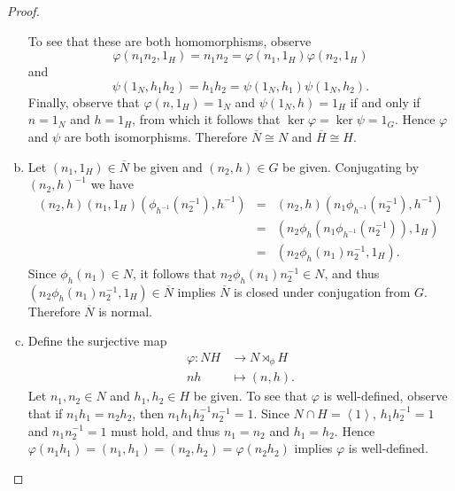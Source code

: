 \documentclass[10pt]{amsart}
\begin{document}
\begin{thm}
\begin{proof}
\begin{enumerate}[(a)]
      To see that these are both homomorphisms, observe
      $$\varphi(n_1n_2, 1_H) = n_1n_2 = \varphi(n_1, 1_H)\varphi(n_2, 1_H)$$
      and
      $$\psi(1_N, h_1h_2) = h_1h_2 = \psi(1_N, h_1)\psi(1_N, h_2).$$
      Finally, observe that $\varphi(n,1_H) = 1_N$ and $\psi(1_N, h) = 1_H$ if and only if $n = 1_N$ and $h = 1_H$, from which it follows that $\ker\varphi = \ker\psi = 1_G$.
      Hence $\varphi$ and $\psi$ are both isomorphisms.
      Therefore $\overline{N} \cong N$ and $\overline{H} \cong H$.
    \item
      Let $(n_1, 1_H) \in \overline{N}$ be given and $(n_2, h) \in G$ be given.
      Conjugating by $(n_2, h)^{-1}$ we have
      \begin{eqnarray*}
      (n_2, h)(n_1, 1_H)(\phi_{h^{-1}}(n_2^{-1}), h^{-1}) &=& (n_2, h)(n_1\phi_{h^{-1}}(n_2^{-1}), h^{-1})\\
	   &=& (n_2\phi_h(n_1\phi_{h^{-1}}(n_2^{-1})), 1_H)\\
       &=& (n_2\phi_h(n_1)n_2^{-1}, 1_H).
      \end{eqnarray*}
      Since $\phi_h(n_1) \in N$, it follows that $n_2\phi_h(n_1)n_2^{-1} \in N$, and thus $(n_2\phi_h(n_1)n_2^{-1}, 1_H) \in \overline{N}$ implies $\overline{N}$ is closed under conjugation from $G$.
      Therefore $\overline{N}$ is normal.
      
    \item
      Define the surjective map
      \begin{align*}
	\varphi \colon NH &\rightarrow N \rtimes_{\phi} H\\
	nh & \mapsto (n, h).
      \end{align*}
      Let $n_1, n_2 \in N$ and $h_1, h_2 \in H$ be given.
      To see that $\varphi$ is well-defined, observe that if $n_1h_1 = n_2h_2$, then $n_1h_1h_2^{-1}n_2^{-1} = 1$.
      Since $N \cap H = \left< 1 \right>$, $h_1h_2^{-1} = 1$ and $n_1n_2^{-1} = 1$ must hold, and thus $n_1 = n_2$ and $h_1 = h_2$.
      Hence $\varphi(n_1h_1) = (n_1,h_1) = (n_2, h_2) = \varphi(n_2h_2)$ implies $\varphi$ is well-defined.
      

\end{enumerate}
\end{proof}
\end{thm}
\end{document}
